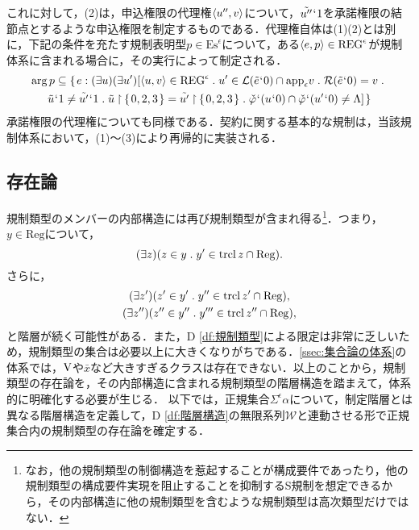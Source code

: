 これに対して，(2)は，申込権限の代理権$ \langle u'',v \rangle $について，$ \tilde{u''}{\mspace{1mu}{`}\mspace{1mu}} 1 $を承諾権限の結節点とするような申込権限を制定するものである．代理権自体は(1)(2)とは別に，下記の条件を充たす規制表明型$ p\in\mathrm{Es}^\epsilon $について，ある$ \langle e,p \rangle\in\mathrm{REG}^\epsilon $が規制体系に含まれる場合に，その実行によって制定される．
\begin{multline}
    \arg p\subseteq \classab{e:
    (\exists u)(\exists u')[
        \orp{u,v}\in\mathrm{REG}^\epsilon\con{1}u'\in \mathcal{L}(\tilde{e}\fap 0)\cap\app{\epsilon} v\con{1}\mathcal{R}(\tilde{e}\fap 0) = v\con{1}\\
        \tilde{u}\fap 1\neq \tilde{u'}\fap 1\con{1}
        \tilde{u}\uphr\classab{0,2,3} = \tilde{u'}\uphr\classab{0,2,3}\con{1}
        \check{\varphi}\fap(u\fap 0)\cap\check{\varphi}\fap(u'\fap 0)\neq\Lambda
    ]
}
\end{multline}
承諾権限の代理権についても同様である．契約に関する基本的な規制は，当該規制体系において，(1)〜(3)により再帰的に実装される．


\subsection{存在論}
\label{ssec:存在論}

規制類型のメンバーの内部構造には再び規制類型が含まれ得る\footnote{なお，他の規制類型の制御構造を惹起することが構成要件であったり，他の規制類型の構成要件実現を阻止することを抑制するS規制を想定できるから，その内部構造に他の規制類型を含むような規制類型は高次類型だけではない．}．つまり，$y\in\mathrm{Reg}$について，
\[
    (\exists z)(z\in y\con{1}y' \in \trcl z\cap \mathrm{Reg}).
\]
さらに，
\begin{gather*}
    (\exists z')(z'\in y'\con{1}y'' \in \trcl z'\cap \mathrm{Reg}),\\
    (\exists z'')(z''\in y''\con{1}y''' \in \trcl z''\cap \mathrm{Reg}),
\end{gather*}
と階層が続く可能性がある．また，D \ref{df:規制類型}による限定は非常に乏しいため，規制類型の集合は必要以上に大きくなりがちである．\ref{ssec:集合論の体系}の体系では，$\mathrm{V}$や$\bar{x}$など大きすぎるクラスは存在できない．以上のことから，規制類型の存在論を，その内部構造に含まれる規制類型の階層構造を踏まえて，体系的に明確化する必要が生じる．
以下では，正規集合$\varSigma^{\epsilon}\alpha$について，制定階層とは異なる階層構造を定義して，D \ref{df:階層構造}の無限系列$ \mathcal{W} $と連動させる形で正規集合内の規制類型の存在論を確定する．


